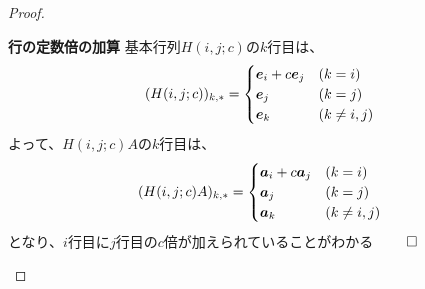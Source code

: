 \documentclass[../../../topic_linear-algebra]{subfiles}
\begin{document}
\begin{proof}
  \begin{subpattern}{\bfseries 行の定数倍の加算}
    基本行列$H(i,j;c)$の$k$行目は、
    \begin{equation*}
      (H(i,j;c))_{k,*} = \begin{cases}
        \vb*{e}_i + c \vb*{e}_j & (k=i)        \\
        \vb*{e}_j               & (k=j)        \\
        \vb*{e}_k               & (k \neq i,j)
      \end{cases}
    \end{equation*}
    よって、$H(i,j;c)A$の$k$行目は、
    \begin{equation*}
      (H(i,j;c)A)_{k,*} = \begin{cases}
        \vb*{a}_i + c \vb*{a}_j & (k=i)        \\
        \vb*{a}_j               & (k=j)        \\
        \vb*{a}_k               & (k \neq i,j)
      \end{cases}
    \end{equation*}
    となり、$i$行目に$j$行目の$c$倍が加えられていることがわかる $\qed$
  \end{subpattern}
\end{proof}
\end{document}
